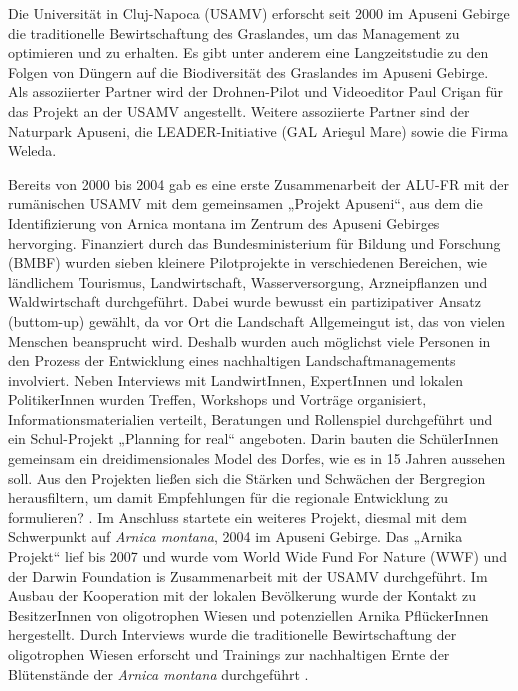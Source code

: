 Die Universität in Cluj-Napoca (USAMV) erforscht seit 2000 im Apuseni Gebirge die traditionelle Bewirtschaftung des Graslandes, um das Management zu optimieren und zu erhalten. Es gibt unter anderem eine Langzeitstudie zu den Folgen von Düngern auf die Biodiversität des Graslandes im Apuseni Gebirge. Als assoziierter Partner wird der Drohnen-Pilot und Videoeditor Paul Crişan für das Projekt an der USAMV angestellt. Weitere assoziierte Partner sind der Naturpark Apuseni, die LEADER-Initiative (GAL Arieşul Mare) sowie die Firma Weleda.

Bereits von 2000 bis 2004 gab es eine erste Zusammenarbeit der ALU-FR mit der rumänischen USAMV mit dem gemeinsamen „Projekt Apuseni“, aus dem die Identifizierung von Arnica montana im Zentrum des Apuseni Gebirges hervorging. Finanziert durch das Bundesministerium für Bildung und Forschung (BMBF) wurden sieben kleinere Pilotprojekte in verschiedenen Bereichen, wie ländlichem Tourismus, Landwirtschaft, Wasserversorgung, Arzneipflanzen und Waldwirtschaft durchgeführt. Dabei wurde bewusst ein partizipativer Ansatz (buttom-up) gewählt, da vor Ort die Landschaft Allgemeingut ist, das von vielen Menschen beansprucht wird. Deshalb wurden auch möglichst viele Personen in den Prozess der Entwicklung eines nachhaltigen Landschaftmanagements involviert. Neben Interviews mit LandwirtInnen, ExpertInnen und lokalen PolitikerInnen wurden Treffen, Workshops und  Vorträge organisiert, Informationsmaterialien verteilt, Beratungen und Rollenspiel durchgeführt und ein Schul-Projekt „Planning for real“ angeboten. Darin bauten die SchülerInnen gemeinsam ein dreidimensionales Model des Dorfes, wie es in 15 Jahren aussehen soll. Aus den Projekten ließen sich die Stärken und Schwächen der Bergregion herausfiltern, um damit Empfehlungen für die regionale Entwicklung zu formulieren? \citep[vgl.][]{RUSDEA2009}.
Im Anschluss startete ein weiteres Projekt, diesmal mit dem Schwerpunkt auf \textit{Arnica montana}, 2004 im Apuseni Gebirge. Das „Arnika Projekt“ lief bis 2007 und wurde vom World Wide Fund For Nature (WWF) und der Darwin Foundation is Zusammenarbeit mit der USAMV durchgeführt. Im Ausbau der Kooperation mit der lokalen Bevölkerung wurde der Kontakt zu BesitzerInnen von oligotrophen Wiesen und potenziellen Arnika PflückerInnen hergestellt. Durch Interviews wurde die traditionelle Bewirtschaftung der oligotrophen Wiesen erforscht und Trainings zur nachhaltigen Ernte der Blütenstände der \textit{Arnica montana} durchgeführt \citep[vgl.][20]{DBU2018}.

